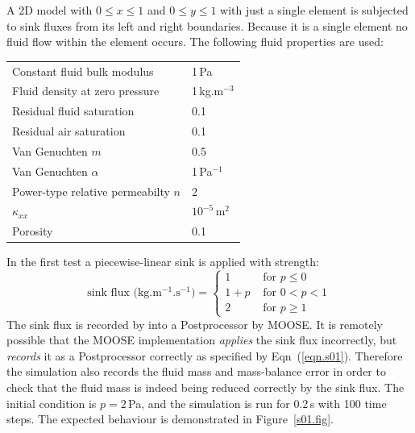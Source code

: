 \documentclass[]{scrreprt}
\begin{document}
A 2D model with $0\leq x \leq 1$ and $0\leq y \leq 1$ with just a
single element is subjected to sink fluxes from its left and right
boundaries.  Because it is a single element no fluid flow within the
element occurs.  The following fluid properties are used:
\begin{center}
\begin{tabular}{|ll|}
\hline
Constant fluid bulk modulus & 1\,Pa \\
Fluid density at zero pressure & 1\,kg.m$^{-3}$ \\
Residual fluid saturation & 0.1 \\
Residual air saturation & 0.1 \\
Van Genuchten $m$ & 0.5 \\
Van Genuchten $\alpha$ & 1\,Pa$^{-1}$ \\
Power-type relative permeabilty $n$ & 2 \\
$\kappa_{xx}$ & $10^{-5}$\,m$^{2}$ \\
Porosity & 0.1 \\
\hline
\end{tabular} 
\end{center}

\noindent In the first test a piecewise-linear sink is applied with strength:
\begin{equation}
\mbox{sink flux (kg.m$^{-1}$.s$^{-1}$)} = \left\{
\begin{array}{ll}
1 & \mbox{ for } p \leq 0 \\
1+p & \mbox{ for } 0<p<1 \\
2 & \mbox{ for } p\geq 1 
\end{array}
\right.
\label{eqn.s01}
\end{equation}
The sink flux is recorded by into a Postprocessor by MOOSE.  It is
remotely possible that the MOOSE implementation {\em applies} the sink
flux incorrectly, but {\em records} it as a Postprocessor correctly as
specified by Eqn~(\ref{eqn.s01}).  Therefore the simulation also
records the fluid mass and mass-balance error in order to check that
the fluid mass is indeed being reduced correctly by the sink flux.
The initial condition is $p=2$\,Pa, and the simulation is run for
0.2\,s with 100 time steps.  The expected behaviour is demonstrated in
Figure~\ref{s01.fig}.
\end{document}
